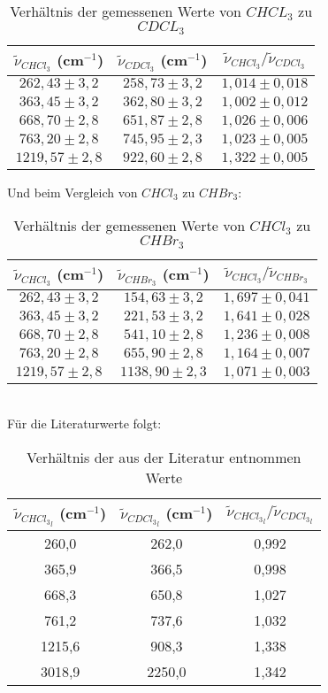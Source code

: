 \begin{table}[h]
    \centering\begin{tabular}{c|c|c}
        $\tilde{\nu}_{CHCl_3}$ (cm$^{-1}$) & $\tilde{\nu}_{CDCl_3}$ (cm$^{-1}$) & $\tilde{\nu}_{CHCl_3}/\tilde{\nu}_{CDCl_3}$\\\hline
        $262,43\pm3,2$ &$258,73\pm3,2$&$1,014\pm0,018$\\
        $363,45\pm3,2$ &$362,80\pm3,2$&$1,002\pm0,012$\\
        $668,70\pm2,8$ &$651,87\pm2,8$&$1,026\pm0,006$\\
        $763,20\pm2,8$ &$745,95\pm2,3$&$1,023\pm0,005$\\
        $1219,57\pm2,8$&$922,60\pm2,8$&$1,322\pm0,005$%
    \end{tabular}
    \caption{Verhältnis der gemessenen Werte von $CHCL_3$ zu $CDCL_3$}
\end{table}\newpage
Und beim Vergleich von $CHCl_3$ zu $CHBr_3$:
\begin{table}[h]
    \centering\begin{tabular}{c|c|c}
        $\tilde{\nu}_{CHCl_3}$ (cm$^{-1}$) & $\tilde{\nu}_{CHBr_3}$ (cm$^{-1}$) & $\tilde{\nu}_{CHCl_3}/\tilde{\nu}_{CHBr_3}$\\\hline
        $262,43\pm3,2$ &$154,63\pm3,2$&$1,697\pm0,041$\\
        $363,45\pm3,2$ &$221,53\pm3,2$&$1,641\pm0,028$\\
        $668,70\pm2,8$ &$541,10\pm2,8$&$1,236\pm0,008$\\
        $763,20\pm2,8$ &$655,90\pm2,8$&$1,164\pm0,007$\\
        $1219,57\pm2,8$&$1138,90\pm2,3$&$1,071\pm0,003$
    \end{tabular}
    \caption{Verhältnis der gemessenen Werte von $CHCl_3$ zu $CHBr_3$}
\end{table}\\
Für die Literaturwerte folgt:
\begin{table}[h]
    \centering\begin{tabular}{c|c|c}
        $\tilde{\nu}_{{CHCl_3}_l}$ (cm$^{-1}$) & $\tilde{\nu}_{{CDCl_3}_l}$ (cm$^{-1}$) & $\tilde{\nu}_{{CHCl_3}_l}/\tilde{\nu}_{{CDCl_3}_l}$\\\hline
        260,0&262,0&0,992\\
        365,9&366,5&0,998\\
        668,3&650,8&1,027\\
        761,2&737,6&1,032\\
        1215,6&908,3&1,338\\
        3018,9&2250,0&1,342
    \end{tabular}
    \caption{Verhältnis der aus der Literatur entnommen Werte}
\end{table}
